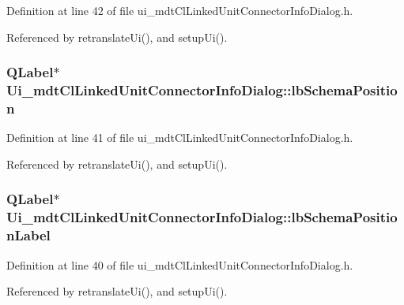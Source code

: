 Definition at line 42 of file ui\-\_\-mdt\-Cl\-Linked\-Unit\-Connector\-Info\-Dialog.\-h.



Referenced by retranslate\-Ui(), and setup\-Ui().

\hypertarget{class_ui__mdt_cl_linked_unit_connector_info_dialog_a56f38137f46f1ceb4d578fa7cfc57046}{
\subsubsection[{lb\-Schema\-Position}]{\setlength{\rightskip}{0pt plus 5cm}Q\-Label$\ast$ Ui\-\_\-mdt\-Cl\-Linked\-Unit\-Connector\-Info\-Dialog\-::lb\-Schema\-Position}}\label{class_ui__mdt_cl_linked_unit_connector_info_dialog_a56f38137f46f1ceb4d578fa7cfc57046}


Definition at line 41 of file ui\-\_\-mdt\-Cl\-Linked\-Unit\-Connector\-Info\-Dialog.\-h.



Referenced by retranslate\-Ui(), and setup\-Ui().

\hypertarget{class_ui__mdt_cl_linked_unit_connector_info_dialog_aba9ea2741682576187856511f769886a}{
\subsubsection[{lb\-Schema\-Position\-Label}]{\setlength{\rightskip}{0pt plus 5cm}Q\-Label$\ast$ Ui\-\_\-mdt\-Cl\-Linked\-Unit\-Connector\-Info\-Dialog\-::lb\-Schema\-Position\-Label}}\label{class_ui__mdt_cl_linked_unit_connector_info_dialog_aba9ea2741682576187856511f769886a}


Definition at line 40 of file ui\-\_\-mdt\-Cl\-Linked\-Unit\-Connector\-Info\-Dialog.\-h.



Referenced by retranslate\-Ui(), and setup\-Ui().


